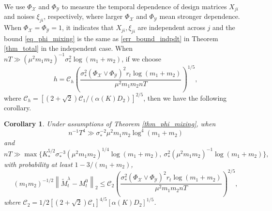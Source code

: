 \documentclass[12pt]{article}
\newtheorem{cor}{Corollary}
\begin{document}
  We use $\Phi_\mathcal{X}$ and $\Phi_\mathcal{Y}$ to measure the temporal dependence of design matrices $X_{ji}$ and noises $\xi_{ji}$, respectively, where larger $\Phi_\mathcal{X}$ and $\Phi_{\mathcal{Y}}$ mean stronger dependence. When $\Phi_{\mathcal{X}}=\Phi_{\mathcal{Y}}=1$, it indicates that $X_{ji},\xi_{ji}$ are independent across $j$ and the bound \eqref{eq_phi_mixing} is the same as \eqref{err_bound_indpdt} in Theorem \ref{thm_total} in the independent case.
  When $nT\gg (\mu^2m_1m_2)^{-1}\sigma_*^2\log(m_1+m_2)$,
  if we choose
  \begin{equation}
  \label{eq_bandwidth}
  h=\mathcal{C}_h\left(\frac{\sigma_*^2(\Phi_{\mathcal{X}}\vee \Phi_{\mathcal{Y}})^2r_t\log(m_1+m_2)}{\mu^2m_1m_2nT}\right)^{1/5},
  \end{equation}
  where $\mathcal{C}_h = \left[(2+\sqrt{2})\mathcal{C}_1/(\alpha(K)D_2)\right]^{2/5}$, then we have the following corollary.
  \begin{cor}
  \label{cor_phi_mixing}
  Under assumptions of Theorem \ref{thm_phi_mixing}, when 
  $$n^{-1}T^4\gg\sigma_*^{-2}\mu^2m_1m_2\log^4(m_1+m_2) $$%
  and
  $$ nT\gg\max\{K_*^{5/2}\sigma_*^{-3}(\mu^{2}m_1m_2)^{1/4}\log(m_1+m_2),\ \sigma_*^2(\mu^{2}m_1m_2)^{-1}\log(m_1+m_2)\},$$
  with probability at least $1-3/(m_1+m_2)$,
  \begin{equation}\label{eq_phi_mixing_general_bound}
  (m_1m_2)^{-1/2}\left\|\widetilde{M}_t^\lambda - M_t^0\right\|_2 \le \mathcal{C}_2\left(\frac{\sigma_*^2(\Phi_\mathcal{X}\vee \Phi_\mathcal{Y})^2r_t\log(m_1+m_2)}{\mu^2m_1m_2 n T}\right)^{2/5},
  \end{equation}
  where $\mathcal{C}_2 =1/2\left[(2+\sqrt{2})\mathcal{C}_1\right]^{4/5}\left[\alpha(K)D_2\right]^{1/5}$.
  \end{cor}
\end{document}
